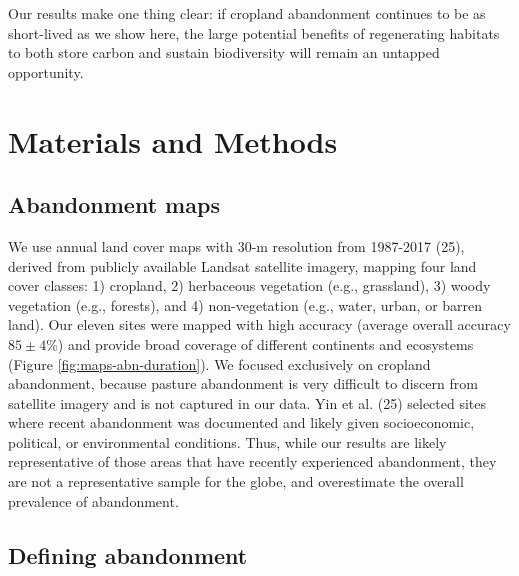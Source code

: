\documentclass[9pt,twocolumn,twoside,lineno]{pnas-new}
\begin{document}
Our results make one thing clear: if cropland abandonment continues to be as short-lived as we show here, the large potential benefits of regenerating habitats to both store carbon and sustain biodiversity will remain an untapped opportunity.

\hypertarget{methods}{%
\section*{Materials and Methods}\label{methods}}

\hypertarget{abandonment-maps}{%
\subsection*{Abandonment maps}\label{abandonment-maps}}

We use annual land cover maps with 30-m resolution from 1987-2017 (25), derived from publicly available Landsat satellite imagery, mapping four land cover classes: 1) cropland, 2) herbaceous vegetation (e.g., grassland), 3) woody vegetation (e.g., forests), and 4) non-vegetation (e.g., water, urban, or barren land).
Our eleven sites were mapped with high accuracy (average overall accuracy \(85\pm4\)\%) and provide broad coverage of different continents and ecosystems (Figure \ref{fig:maps-abn-duration}).
We focused exclusively on cropland abandonment, because pasture abandonment is very difficult to discern from satellite imagery and is not captured in our data.
Yin et al. (25) selected sites where recent abandonment was documented and likely given socioeconomic, political, or environmental conditions.
Thus, while our results are likely representative of those areas that have recently experienced abandonment, they are not a representative sample for the globe, and overestimate the overall prevalence of abandonment.

\hypertarget{defining-abandonment}{%
\subsection*{Defining abandonment}\label{defining-abandonment}}
\end{document}
